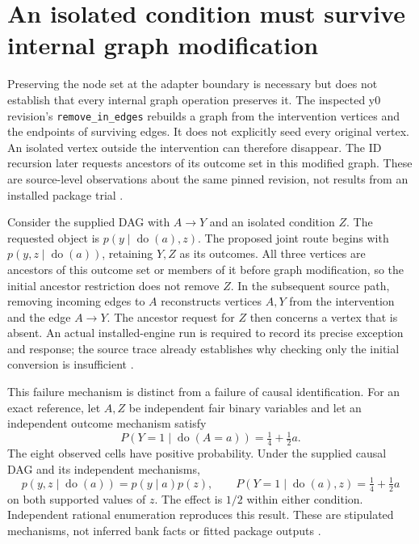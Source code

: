 \section{An isolated condition must survive internal graph modification}
\label{exec13:isolated-condition}

Preserving the node set at the adapter boundary is necessary but does not
establish that every internal graph operation preserves it. The inspected y0
revision's \texttt{remove\_in\_edges} rebuilds a graph from the intervention
vertices and the endpoints of surviving edges. It does not explicitly seed
every original vertex. An isolated vertex outside the intervention can
therefore disappear. The ID recursion later requests ancestors of its outcome
set in this modified graph. These are source-level observations about the
same pinned revision, not results from an installed package trial
\citep{exec13_y0_graph,exec13_y0_id}.

Consider the supplied DAG with \(A\to Y\) and an isolated condition \(Z\).
The requested object is \(p(y\mid\operatorname{do}(a),z)\). The proposed
joint route begins with \(p(y,z\mid\operatorname{do}(a))\), retaining
\(Y,Z\) as its outcomes. All three vertices are ancestors of this outcome
set or members of it before graph modification, so the initial ancestor
restriction does not remove \(Z\). In the subsequent source path, removing
incoming edges to \(A\) reconstructs vertices \(A,Y\) from the intervention
and the edge \(A\to Y\). The ancestor request for \(Z\) then concerns a
vertex that is absent. An actual installed-engine run is required to record
its precise exception and response; the source trace already establishes
why checking only the initial conversion is insufficient
\citep{exec13_isolated_reference}.

This failure mechanism is distinct from a failure of causal identification.
For an exact reference, let \(A,Z\) be independent fair binary variables and
let an independent outcome mechanism satisfy
\[
 P(Y=1\mid\operatorname{do}(A=a))=\tfrac14+\tfrac12a.
\]
The eight observed cells have positive probability. Under the supplied
causal DAG and its independent mechanisms,
\[
 p(y,z\mid\operatorname{do}(a))=p(y\mid a)p(z),\qquad
 P(Y=1\mid\operatorname{do}(a),z)=\tfrac14+\tfrac12a
\]
on both supported values of \(z\). The effect is \(1/2\) within either
condition. Independent rational enumeration reproduces this result. These
are stipulated mechanisms, not inferred bank facts or fitted package
outputs \citep{exec13_isolated_reference}.

